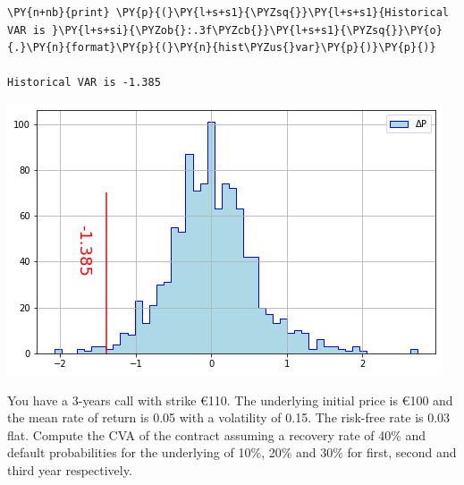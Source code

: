 \begin{Answer}
\begin{tcolorbox}[size=fbox, boxrule=1pt, colback=cellbackground, colframe=cellborder]
\begin{Verbatim}[commandchars=\\\{\}]
\PY{n+nb}{print} \PY{p}{(}\PY{l+s+s1}{\PYZsq{}}\PY{l+s+s1}{Historical VAR is }\PY{l+s+si}{\PYZob{}:.3f\PYZcb{}}\PY{l+s+s1}{\PYZsq{}}\PY{o}{.}\PY{n}{format}\PY{p}{(}\PY{n}{hist\PYZus{}var}\PY{p}{)}\PY{p}{)}

Historical VAR is -1.385
\end{Verbatim}
\end{tcolorbox}

\includegraphics{figures/hist_var_ex}
\end{Answer}

\begin{Exercise}[title={(Credit Valuation Adjustment)}]
You have a 3-years call with strike \euro{110}. The underlying initial price is \euro{100} and the mean rate of return is 0.05 with a volatility of 0.15. The risk-free rate is 0.03 flat.
Compute the CVA of the contract assuming a recovery rate of 40\% and default probabilities for the underlying of 10\%, 20\% and 30\% for first, second and third year respectively.
\end{Exercise}

